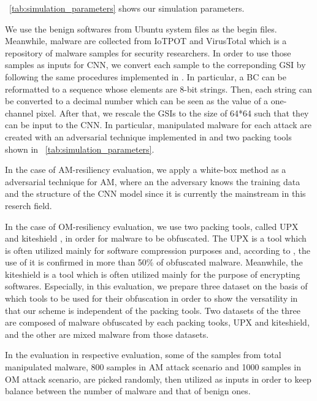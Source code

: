 \documentclass{ieeeaccess}
\begin{document}
\tablename~\ref{tab:simulation_parameters} shows our simulation parameters.  

We use the benign softwares from Ubuntu system files \cite{ubuntu} as the begin files.
Meanwhile, malware are collected from IoTPOT \cite{iotpot} and VirusTotal \cite{virustotal} which is a repository of malware samples for security researchers.
In order to use those samples as inputs for CNN, we convert each sample to the correponding GSI by following the same procedures implemented in \cite{previous}.
In particular, a BC can be reformatted to a sequence whose elements are 8-bit strings.
Then, each string can be converted to a decimal number which can be seen as the value of a one-channel pixel.
After that, we rescale the GSIs to the size of 64*64 such that they can be input to the CNN.
In particular, manipulated malware for each attack are created with an adversarial technique implemented in \cite{am, yamafumi} and two packing tools \cite{upx, kiteshield} shown in \tablename~\ref{tab:simulation_parameters}.

In the case of AM-resiliency evaluation, we apply a white-box method as a adversarial technique for AM, where an the adversary knows the training data and the structure of the CNN model since it is currently the mainstream in this reserch field.

In the case of OM-resiliency evaluation, we use two packing tools, called UPX \cite{upx} and kiteshield \cite{kiteshield}, in order for malware to be obfuscated.
The UPX is a tool which is often utilized mainly for software compression purposes and, according to \cite{pack_research}, the use of it is confirmed in more than 50\% of obfuscated malware. 
Meanwhile, the kiteshield is a tool which is often utilized mainly for the purpose of encrypting softwares.
Especially, in this evaluation, we prepare three dataset on the basis of which tools to be used for their obfuscation in order to show the versatility in that our scheme is independent of the packing tools.
Two datasets of the three are composed of malware obfuscated by each packing tooks, UPX and kiteshield, and the other are mixed malware from those datasets. 

In the evaluation in respective evaluation, some of the samples from total manipulated malware, 800 samples in AM attack scenario and 1000 samples in OM attack scenario, are picked randomly, then utilized as inputs in order to keep balance between the number of malware and that of benign ones.
\end{document}
